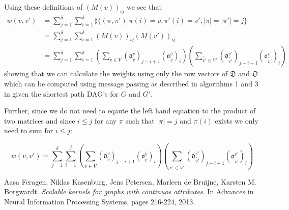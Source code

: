 \documentclass{article}
\begin{document}
Using these definitions of $(M(v))_{ij}$ we see that
\begin{align}
w(v,v')&=\sum_{j=1}^{\delta}\sum_{i=1}^{\delta}\sharp\{(\pi, \pi')|\pi(i)=v,\pi'(i)=v',|\pi|=|\pi'|=j\}\\
&=\sum_{j=1}^{\delta}\sum_{i=1}^{\delta}(M(v))_{ij}(M(v'))_{ij}\\
&=\sum_{j=1}^{\delta}\sum_{i=1}^{\delta}\left(\sum_{\tilde{v}\in V}(\mathfrak{d}_{\tilde{v}}^v)_{j-i+1}(\mathfrak{o}_{\tilde{v}}^v)_i\right)\left(\sum_{\tilde{v'}\in V'}(\mathfrak{d}_{\tilde{v'}}^{v'})_{j-i+1}(\mathfrak{o}_{\tilde{v'}}^{v'})_i\right)
\end{align}
showing that we can calculate the weights using only the row vectors of $\mathfrak{D}$ and $\mathfrak{O}$ which can be computed using message passing as described in algorithms 1 and 3 in \cite{graphhopper} given the shortest path DAG's for $G$ and $G'$.

Further, since we do not need to eqaute the left hand equation to the product of two matrices and since $i\leq j$ for any $\pi$ such that $|\pi|=j$ and $\pi(i)$ exists we only need to sum for $i\leq j$:

\begin{equation}
w(v,v')=\sum_{j=1}^{\delta}\sum_{i=1}^{j}\left(\sum_{\tilde{v}\in V}(\mathfrak{d}_{\tilde{v}}^v)_{j-i+1}(\mathfrak{o}_{\tilde{v}}^v)_i\right)\left(\sum_{\tilde{v'}\in V'}(\mathfrak{d}_{\tilde{v'}}^{v'})_{j-i+1}(\mathfrak{o}_{\tilde{v'}}^{v'})_i\right)
\end{equation}
\fi

\newpage

\renewcommand\refname{References}
\begin{thebibliography}{9}
		Aasa Feragen, Niklas Kasenburg, Jens Petersen, Marleen de Bruijne, Karsten M. Borgwardt.
		\emph{Scalable kernels for graphs with continuos attributes}.
		In Advances in Neural Information Processing Systems, pages 216-224, 2013.
\end{thebibliography}
\end{document}
